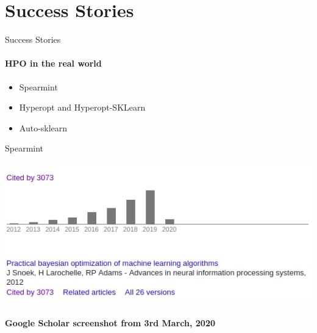 \section{Success Stories}
\begin{frame}[c]{Success Stories}
\framesubtitle{HPO in the real world}
\begin{itemize}
    \item Spearmint
    \item Hyperopt and Hyperopt-SKLearn
    \item Auto-sklearn
\end{itemize}

\end{frame}
\begin{frame}[c]{Spearmint}
\pause
\begin{center}
    \includegraphics[width=.9\linewidth, height=0.9\textheight, keepaspectratio=true]{w07_hpo_grey_box/images/success_stories/spearmint_alt_stats.png}
    \newline \paragraph{Google Scholar screenshot from 3rd March, 2020}
\end{center}
\end{frame}
